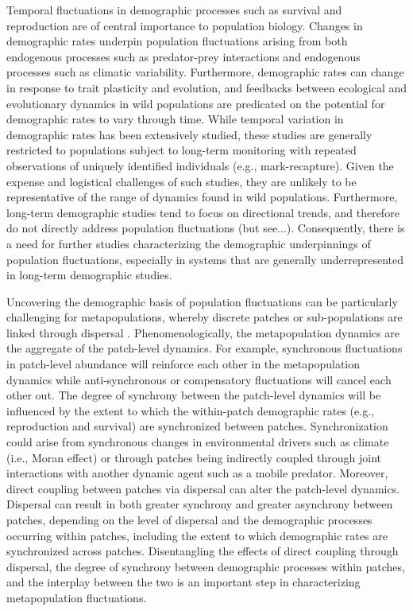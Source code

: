 \documentclass[11pt]{article}
\begin{document}
Temporal fluctuations in demographic processes such as survival and reproduction
are of central importance to population biology.
Changes in demographic rates underpin population fluctuations arising from both 
endogenous processes such as predator-prey interactions and endogenous processes
such as climatic variability.
Furthermore, demographic rates can change in response to trait plasticity and evolution,
and feedbacks between ecological and evolutionary dynamics in wild populations 
are predicated on the potential for demographic rates to vary through time.
While temporal variation in demographic rates has been extensively studied,
these studies are generally restricted to populations subject to long-term monitoring
with repeated observations of uniquely identified individuals (e.g., mark-recapture).
Given the expense and logistical challenges of such studies, 
they are unlikely to be representative of the range of dynamics found in wild populations.
Furthermore, long-term demographic studies tend to focus on directional trends, 
and therefore do not directly address population fluctuations 
(but see...).
Consequently, there is a need for further studies characterizing the demographic underpinnings 
of population fluctuations, especially in systems that are generally
underrepresented in long-term demographic studies.

Uncovering the demographic basis of population fluctuations can be particularly challenging
for metapopulations, 
whereby discrete patches or sub-populations are linked through dispersal
\citep{hanski1998}.
Phenomenologically, the metapopulation dynamics are the aggregate of the patch-level dynamics.
For example, synchronous fluctuations in patch-level abundance will reinforce each other in the metapopulation dynamics while anti-synchronous or compensatory 
fluctuations will cancel each other out. 
The degree of synchrony between the patch-level dynamics will be influenced
by the extent to which the within-patch demographic rates 
(e.g., reproduction and survival) are synchronized between patches.
Synchronization could arise from synchronous changes in environmental
drivers such as climate (i.e., Moran effect) 
or through patches being indirectly coupled through joint interactions with another 
dynamic agent such as a mobile predator. 
Moreover, direct coupling between patches via dispersal can alter the patch-level dynamics.
Dispersal can  result in both greater synchrony and greater asynchrony between patches, 
depending on the level of dispersal and the demographic processes occurring within patches,
including the extent to which demographic rates are synchronized across patches. 
Disentangling the effects of direct coupling through dispersal, 
the degree of synchrony between demographic processes within patches, 
and the interplay between the two 
is an important step in characterizing metapopulation fluctuations.
\end{document}
